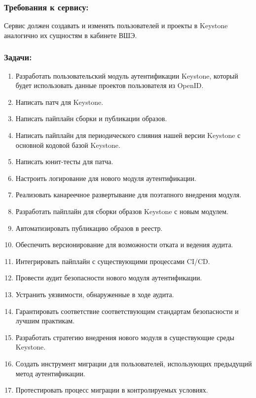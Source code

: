 \documentclass[14pt, a4paper]{extarticle}
\begin{document}
\subsubsection*{Требования к сервису:}

Сервис должен создавать и изменять пользователей и проекты в Keystone аналогично их сущностям в кабинете ВШЭ.

\subsubsection*{Задачи:}

\begin{enumerate}
\item Разработать пользовательский модуль аутентификации Keystone, который будет использовать данные проектов пользователя из OpenID.
\item Написать патч для Keystone.
\item Написать пайплайн сборки и публикации образов.
\item Написать пайплайн для периодического слияния нашей версии Keystone с основной кодовой базой Keystone.
\item Написать юнит-тесты для патча.
\item Настроить логирование для нового модуля аутентификации.
\item Реализовать канареечное развертывание для поэтапного внедрения модуля.
\item Разработать пайплайн для сборки образов Keystone с новым модулем.
\item Автоматизировать публикацию образов в реестр.
\item Обеспечить версионирование для возможности отката и ведения аудита.
\item Интегрировать пайплайн с существующими процессами CI/CD.
\item Провести аудит безопасности нового модуля аутентификации.
\item Устранить уязвимости, обнаруженные в ходе аудита.
\item Гарантировать соответствие соответствующим стандартам безопасности и лучшим практикам.
\item Разработать стратегию внедрения нового модуля в существующие среды Keystone.
\item Создать инструмент миграции для пользователей, использующих предыдущий метод аутентификации.
\item Протестировать процесс миграции в контролируемых условиях.
\end{enumerate}
\end{document}
